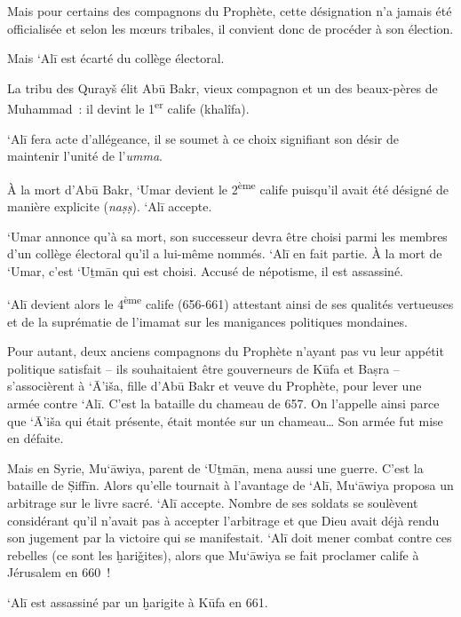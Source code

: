 Mais pour certains des compagnons du Prophète, cette désignation n'a
jamais été officialisée et selon les mœurs tribales, il convient donc de
procéder à son élection.

Mais `Alī est écarté du collège électoral.  

La tribu des Qurayš élit Abū Bakr, vieux compagnon et un des beaux-pères
de Muhammad~: il devint le 1\textsuperscript{er} calife (khalîfa).

`Alī fera acte d'allégeance, il se soumet à ce choix signifiant son
désir de maintenir l'unité de l'\emph{umma}.

À la mort d'Abū Bakr, `Umar devient le 2\textsuperscript{ème} calife
puisqu'il avait été désigné de manière explicite (\emph{naṣṣ}). `Alī
accepte.

`Umar annonce qu'à sa mort, son successeur devra être choisi parmi les
membres d'un collège électoral qu'il a lui-même nommés. `Alī en fait
partie. À la mort de `Umar, c'est `Uṯmān qui est choisi. Accusé de
népotisme, il est assassiné.

`Alī devient alors le 4\textsuperscript{ème} calife (656-661) attestant
ainsi de ses qualités vertueuses et de la suprématie de l'imamat sur les
manigances politiques mondaines.

Pour autant, deux anciens compagnons du Prophète n'ayant pas vu leur
appétit politique satisfait -- ils souhaitaient être gouverneurs de Kūfa
et Baṣra -- s'associèrent à `Ā'iša, fille d'Abū Bakr et veuve du
Prophète, pour lever une armée contre `Alī. C'est la bataille du chameau
de 657. On l'appelle ainsi parce que `Ā'iša qui était présente, était
montée sur un chameau\ldots{} Son armée fut mise en défaite.








Mais en Syrie, Mu`āwiya, parent de `Uṯmān, mena aussi une guerre. C'est
la bataille de Ṣiffīn. Alors qu'elle tournait à l'avantage de `Alī,
Mu`āwiya proposa un arbitrage sur le livre sacré. `Alī accepte. Nombre
de ses soldats se soulèvent considérant qu'il n'avait pas à accepter
l'arbitrage et que Dieu avait déjà rendu son jugement par la victoire
qui se manifestait. `Alī doit mener combat contre ces rebelles (ce sont
les ḫariǧites), alors que Mu`āwiya se fait proclamer calife à Jérusalem
en 660~!

`Alī est assassiné par un ḫarigite à Kūfa en 661.

